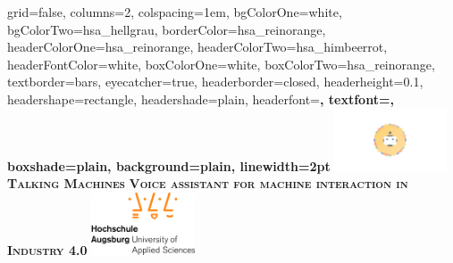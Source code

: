 \documentclass[portrait,final,a2paper,fontscale=0.55]{baposter}
\begin{document}



\begin{poster}%
  {
  grid=false,
  columns=2,
  colspacing=1em,
  bgColorOne=white,
  bgColorTwo=hsa_hellgrau,
  borderColor=hsa_reinorange,
  headerColorOne=hsa_reinorange,
  headerColorTwo=hsa_himbeerrot,
  headerFontColor=white,
  boxColorOne=white,
  boxColorTwo=hsa_reinorange,
  textborder=bars,
  eyecatcher=true,
  headerborder=closed,
  headerheight=0.1\textheight,
  headershape=rectangle,
  headershade=plain,
  headerfont=\Large\bf\sc, %
  textfont={\sf\setlength{\parindent}{1.5em}},
  boxshade=plain,
  background=plain,
  linewidth=2pt
  }
  {
	\includegraphics[height=5em]{images/talking_machines_logo.png}
  } 
  {\bf\textsc{Talking Machines}\vspace{0.5em}}
  {\bf\textsc{Voice assistant for machine interaction in Industry 4.0}\vspace{0.5em}}
  {%
    \includegraphics[height=5em]{images/hsa_logo_normal.jpg}
}
\end{poster}
\end{document}
